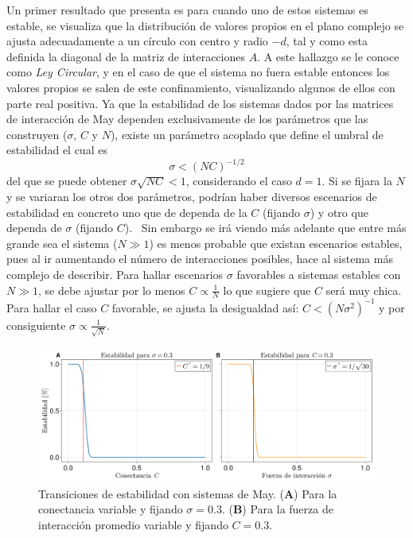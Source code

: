 Un primer resultado que presenta es para cuando uno de estos sistemas es estable, se visualiza que la distribución de valores propios en el plano complejo se ajusta adecuadamente a un círculo con centro y radio $-d$, tal y como esta definida la diagonal de la matriz de interacciones $A$. A este hallazgo se le conoce como \textit{Ley Circular}, y en el caso de que el sistema no fuera estable entonces los valores propios se salen de este confinamiento, visualizando algunos de ellos con parte real positiva.
\newpage
Ya que la estabilidad de los sistemas dados por las matrices de interacción de May dependen exclusivamente de los parámetros que las construyen ($\sigma$, $C$ y $N$), existe un parámetro acoplado que define el umbral de estabilidad \cite{may1972will} el cual es  
\begin{equation}\label{eqn:paramMay}
	\sigma<(NC)^{-1/2}
\end{equation}
del que se puede obtener $\sigma\sqrt{NC}<1$, considerando el caso $d=1$. Si se fijara la $N$ y se variaran los otros dos parámetros, podrían haber diversos escenarios de estabilidad en concreto uno que de dependa de la $C$ (fijando $\sigma$) y otro que dependa de $\sigma$ (fijando $C$). \ Sin embargo se irá viendo más adelante que entre más grande sea el sistema ($N\gg1$) es menos probable que existan escenarios estables, pues al ir aumentando el número de interacciones posibles, hace al sistema más complejo de describir. Para hallar escenarios $\sigma$ favorables a sistemas estables con $N\gg 1$, se debe ajustar por lo menos $C\propto\frac{1}{N}$ lo que sugiere que $C$ será muy chica. Para hallar el caso $C$ favorable, se ajusta la desigualdad así: $C<(N\sigma^2)^{-1}$ y por consiguiente $\sigma\propto\frac{1}{\sqrt{N}}$.
\begin{figure}[h!]
	\centering
	\includegraphics[scale=0.16]{../Imagenes/TransicionesdeMay}
	\caption{Transiciones de estabilidad con sistemas de May. (\textbf{A}) Para la conectancia variable y fijando $\sigma=0.3$. (\textbf{B}) Para la fuerza de interacción promedio variable y fijando $C=0.3$.}
	\label{fig:TransicionesdeMay}
\end{figure}


